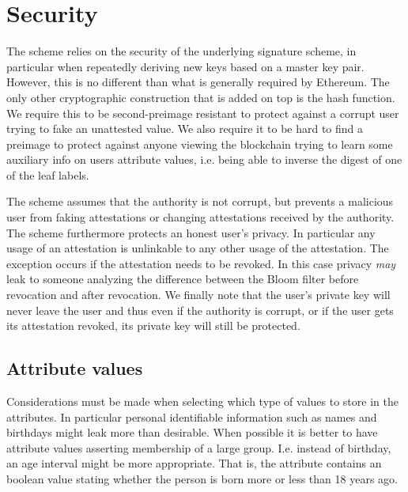 \documentclass[11pt]{article} %
\begin{document}
\section{Security}
The scheme relies on the security of the underlying signature scheme, in particular when repeatedly deriving new keys based on a master key pair. However, this is no different than what is generally required by Ethereum. The only other cryptographic construction that is added on top is the hash function. We require this to be second-preimage resistant to protect against a corrupt user trying to fake an unattested value. We also require it to be hard to find a preimage to protect against anyone viewing the blockchain trying to learn some auxiliary info on users attribute values, i.e. being able to inverse the digest of one of the leaf labels.

The scheme assumes that the authority is not corrupt, but prevents a malicious user from faking attestations or changing attestations received by the authority. The scheme furthermore protects an honest user's privacy. In particular any usage of an attestation is unlinkable to any other usage of the attestation. The exception occurs if the attestation needs to be revoked. In this case privacy \emph{may} leak to someone analyzing the difference between the Bloom filter before revocation and after revocation. We finally note that the user's private key will never leave the user and thus even if the authority is corrupt, or if the user gets its attestation revoked, its private key will still be protected.

\subsection{Attribute values}
Considerations must be made when selecting which type of values to store in the attributes. In particular personal identifiable information such as names and birthdays might leak more than desirable. When possible it is better to have attribute values asserting membership of a large group. I.e. instead of birthday, an age interval might be more appropriate. That is, the attribute contains an boolean value stating whether the person is born more or less than 18 years ago. 




\end{document}
